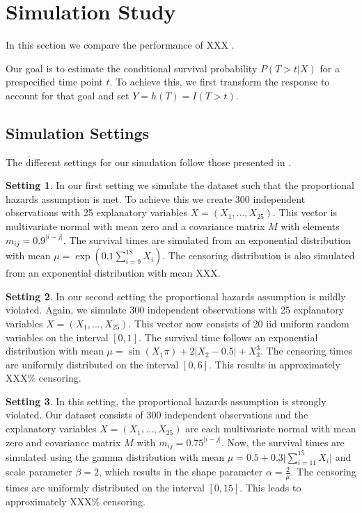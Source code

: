 \documentclass[12pt, a4paper]{article}
\theoremstyle{definition}
\newtheorem{setting}{Setting}
\theoremstyle{plain}
\numberwithin{equation}{section}
\numberwithin{figure}{section}
\numberwithin{table}{section}
\begin{document}
	\newpage

	\section{Simulation Study} \label{simulation}
	In this section we compare the performance of XXX
	.
	
		
	Our goal is to estimate the conditional survival probability $P(T>t\vert X)$ for a prespecified time point $t$.
	To achieve this, we first transform the response to account for that goal and set $Y=h(T)=I(T>t)$.
	
	\subsection{Simulation Settings}

	The different settings for our simulation follow those presented in \citet*{culs}.
	
	\begin{setting}
		In our first setting we simulate the dataset such that the proportional hazards assumption is met.
		To achieve this we create 300 independent observations with 25 explanatory variables $X=(X_1,\dots,X_{25})$.
		This vector is multivariate normal with mean zero and a covariance matrix $M$ with elements $m_{ij}=0.9^{\vert i-j\vert}$.
		The survival times are simulated from an exponential distribution with mean $\mu = \exp\left(0.1\sum_{i=9}^{18}X_i\right)$.
		The censoring distribution is also simulated from an exponential distribution with mean XXX.
	\end{setting}

	\begin{setting}		
		In our second setting the proportional hazards assumption is mildly violated.
		Again, we simulate 300 independent observations with 25 explanatory variables $X=(X_1,\dots, X_{25})$.
		This vector now consists of 20 iid uniform random variables on the interval $[0,1]$.
		The survival time follows an exponential distribution with mean $\mu = \sin(X_1\pi)+2\vert X_2-0.5\vert + X_3^3$.
		The censoring times are uniformly distributed on the interval $[0,6]$.
		This results in approximately XXX\% censoring.
	\end{setting}
		
	\begin{setting}
		In this setting, the proportional hazards assumption is strongly violated.
		Our dataset consists of 300 independent observations and the explanatory variables $X=(X_1,\dots,X_{25})$ are each multivariate normal with mean zero and covariance matrix $M$ with $m_{ij}=0.75^{\vert i-j\vert}$.
		Now, the survival times are simulated using the gamma distribution with  mean $\mu = 0.5 + 0.3 \vert \sum_{i=11}^{15} X_i \vert$ and scale parameter $\beta = 2$, which results in the shape parameter $\alpha = \frac{2}{\mu}$.
		The censoring times are uniformly distributed on the interval $[0,15]$.
		This leads to approximately XXX\% censoring.
	\end{setting}
\end{document}
